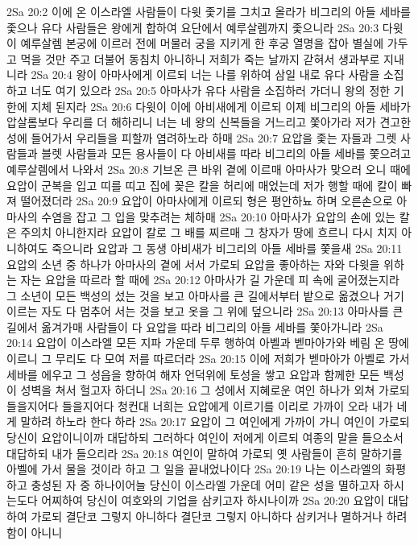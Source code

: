 2Sa 20:2  이에 온 이스라엘 사람들이 다윗 좇기를 그치고 올라가 비그리의 아들 세바를 좇으나 유다 사람들은 왕에게 합하여 요단에서 예루살렘까지 좇으니라
2Sa 20:3  다윗이 예루살렘 본궁에 이르러 전에 머물러 궁을 지키게 한 후궁 열명을 잡아 별실에 가두고 먹을 것만 주고 더불어 동침치 아니하니 저희가 죽는 날까지 갇혀서 생과부로 지내니라
2Sa 20:4  왕이 아마사에게 이르되 너는 나를 위하여 삼일 내로 유다 사람을 소집하고 너도 여기 있으라
2Sa 20:5  아마사가 유다 사람을 소집하러 가더니 왕의 정한 기한에 지체 된지라
2Sa 20:6  다윗이 이에 아비새에게 이르되 이제 비그리의 아들 세바가 압살롬보다 우리를 더 해하리니 너는 네 왕의 신복들을 거느리고 쫓아가라 저가 견고한 성에 들어가서 우리들을 피할까 염려하노라 하매
2Sa 20:7  요압을 좇는 자들과 그렛 사람들과 블렛 사람들과 모든 용사들이 다 아비새를 따라 비그리의 아들 세바를 쫓으려고 예루살렘에서 나와서
2Sa 20:8  기브온 큰 바위 곁에 이르매 아마사가 맞으러 오니 때에 요압이 군복을 입고 띠를 띠고 집에 꽂은 칼을 허리에 매었는데 저가 행할 때에 칼이 빠져 떨어졌더라
2Sa 20:9  요압이 아마사에게 이르되 형은 평안하뇨 하며 오른손으로 아마사의 수염을 잡고 그 입을 맞추려는 체하매
2Sa 20:10  아마사가 요압의 손에 있는 칼은 주의치 아니한지라 요압이 칼로 그 배를 찌르매 그 창자가 땅에 흐르니 다시 치지 아니하여도 죽으니라 요압과 그 동생 아비새가 비그리의 아들 세바를 쫓을새
2Sa 20:11  요압의 소년 중 하나가 아마사의 곁에 서서 가로되 요압을 좋아하는 자와 다윗을 위하는 자는 요압을 따르라 할 때에
2Sa 20:12  아마사가 길 가운데 피 속에 굴어졌는지라 그 소년이 모든 백성의 섰는 것을 보고 아마사를 큰 길에서부터 밭으로 옮겼으나 거기 이르는 자도 다 멈추어 서는 것을 보고 옷을 그 위에 덮으니라
2Sa 20:13  아마사를 큰 길에서 옮겨가매 사람들이 다 요압을 따라 비그리의 아들 세바를 쫓아가니라
2Sa 20:14  요압이 이스라엘 모든 지파 가운데 두루 행하여 아벨과 벧마아가와 베림 온 땅에 이르니 그 무리도 다 모여 저를 따르더라
2Sa 20:15  이에 저희가 벧마아가 아벨로 가서 세바를 에우고 그 성읍을 향하여 해자 언덕위에 토성을 쌓고 요압과 함께한 모든 백성이 성벽을 쳐서 헐고자 하더니
2Sa 20:16  그 성에서 지혜로운 여인 하나가 외쳐 가로되 들을지어다 들을지어다 청컨대 너희는 요압에게 이르기를 이리로 가까이 오라 내가 네게 말하려 하노라 한다 하라
2Sa 20:17  요압이 그 여인에게 가까이 가니 여인이 가로되 당신이 요압이니이까 대답하되 그러하다 여인이 저에게 이르되 여종의 말을 들으소서 대답하되 내가 들으리라
2Sa 20:18  여인이 말하여 가로되 옛 사람들이 흔히 말하기를 아벨에 가서 물을 것이라 하고 그 일을 끝내었나이다
2Sa 20:19  나는 이스라엘의 화평하고 충성된 자 중 하나이어늘 당신이 이스라엘 가운데 어미 같은 성을 멸하고자 하시는도다 어찌하여 당신이 여호와의 기업을 삼키고자 하시나이까
2Sa 20:20  요압이 대답하여 가로되 결단코 그렇지 아니하다 결단코 그렇지 아니하다 삼키거나 멸하거나 하려함이 아니니
